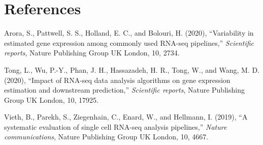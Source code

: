 \documentclass[
  letterpaper,
]{article}
\newenvironment{Shaded}{\begin{snugshade}}{\end{snugshade}}
\newcommand{\AttributeTok}[1]{\textcolor[rgb]{0.40,0.45,0.13}{#1}}
\newcommand{\BuiltInTok}[1]{\textcolor[rgb]{0.00,0.23,0.31}{#1}}
\newcommand{\CommentTok}[1]{\textcolor[rgb]{0.37,0.37,0.37}{#1}}
\newcommand{\ControlFlowTok}[1]{\textcolor[rgb]{0.00,0.23,0.31}{#1}}
\newcommand{\ExtensionTok}[1]{\textcolor[rgb]{0.00,0.23,0.31}{#1}}
\newcommand{\FunctionTok}[1]{\textcolor[rgb]{0.28,0.35,0.67}{#1}}
\newcommand{\OperatorTok}[1]{\textcolor[rgb]{0.37,0.37,0.37}{#1}}
\newcommand{\StringTok}[1]{\textcolor[rgb]{0.13,0.47,0.30}{#1}}
\newcommand{\VariableTok}[1]{\textcolor[rgb]{0.07,0.07,0.07}{#1}}
\newlength{\cslhangindent}
\newlength{\cslentryspacingunit} %
\newenvironment{CSLReferences}[2] %
 {%
  \setlength{\parindent}{0pt}
  \ifodd #1
  \let\oldpar\par
  \def\par{\hangindent=\cslhangindent\oldpar}
  \fi
  \setlength{\parskip}{#2\cslentryspacingunit}
 }%
 {}
\begin{document}
\begin{Shaded}
\end{Shaded}

\hypertarget{references}{%
\section*{References}\label{references}}

\hypertarget{refs}{}
\begin{CSLReferences}{1}{0}
\leavevmode{}%
Arora, S., Pattwell, S. S., Holland, E. C., and Bolouri, H. (2020),
{``Variability in estimated gene expression among commonly used RNA-seq
pipelines,''} \emph{Scientific reports}, Nature Publishing Group UK
London, 10, 2734.

\leavevmode{}%
Tong, L., Wu, P.-Y., Phan, J. H., Hassazadeh, H. R., Tong, W., and Wang,
M. D. (2020), {``Impact of RNA-seq data analysis algorithms on gene
expression estimation and downstream prediction,''} \emph{Scientific
reports}, Nature Publishing Group UK London, 10, 17925.

\leavevmode{}%
Vieth, B., Parekh, S., Ziegenhain, C., Enard, W., and Hellmann, I.
(2019), {``A systematic evaluation of single cell RNA-seq analysis
pipelines,''} \emph{Nature communications}, Nature Publishing Group UK
London, 10, 4667.

\end{CSLReferences}
\end{document}
